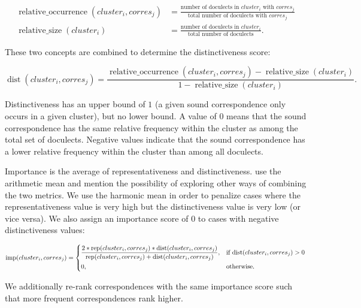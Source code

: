 \documentclass[a4paper]{article}
\begin{document}
\begin{align*}
\operatorname{relative\_occurrence}(cluster_i, corres_j) &= 
\frac{\text{number of doculects in } cluster_i \text{ with }  corres_j}
{\text{total number of doculects with } corres_j}\\
\operatorname{relative\_size}(cluster_i) &= 
\frac{\text{number of doculects in } cluster_i}
{\text{total number of doculects}}
.
\end{align*}

These two concepts are combined to determine the distinctiveness score:

\begin{equation*}
\operatorname{dist}(cluster_i, corres_j) = 
\frac{\operatorname{relative\_occurrence}(cluster_i, corres_j) - \operatorname{relative\_size}(cluster_i)}
{1 - \operatorname{relative\_size}(cluster_i)}
.
\end{equation*}

Distinctiveness has an upper bound of
$1$ (a given sound correspondence only occurs in a given cluster),
but no lower bound.
A value of $0$ means that the sound correspondence
has the same relative frequency within the cluster
as among the total set of doculects.
Negative values indicate that the sound correspondence
has a lower relative frequency within the cluster
than among all doculects.

Importance is the average of representativeness and distinctiveness.
\citet{wieling2011bipartite} use the arithmetic mean
and mention the possibility of exploring
other ways of combining the two metrics.
We use the harmonic mean in order to penalize cases
where the representativeness value is very high
but the distinctiveness value is very low (or vice versa).
We also assign an importance score of $0$ to
cases with negative distinctiveness values:

\begin{equation*}
\operatorname{imp}(cluster_i, corres_j) = 
\begin{dcases}
\frac{
2 * \operatorname{rep}(cluster_i, corres_j) * \operatorname{dist}(cluster_i, corres_j)}
{\operatorname{rep}(cluster_i, corres_j) + \operatorname{dist}(cluster_i, corres_j)}, & \text{if dist}(cluster_i, corres_j) > 0\\
0, & \text{otherwise}.
\end{dcases}
\end{equation*}

We additionally re-rank correspondences
with the same importance score
such that more frequent correspondences rank higher.
\end{document}
